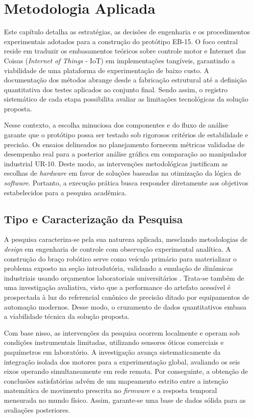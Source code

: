 \chapter{Metodologia Aplicada}

Este capítulo detalha as estratégias, as decisões de engenharia e os procedimentos experimentais adotados para a construção do protótipo EB-15. O foco central reside em traduzir os embasamentos teóricos sobre controle motor e Internet das Coisas (\textit{Internet of Things} - IoT) em implementações tangíveis, garantindo a viabilidade de uma plataforma de experimentação de baixo custo. A documentação dos métodos abrange desde a fabricação estrutural até a definição quantitativa dos testes aplicados ao conjunto final. Sendo assim, o registro sistemático de cada etapa possibilita avaliar as limitações tecnológicas da solução proposta.

Nesse contexto, a escolha minuciosa dos componentes e do fluxo de análise garante que o protótipo possa ser testado sob rigorosos critérios de estabilidade e precisão. Os ensaios delineados no planejamento fornecem métricas validadas de desempenho real para a posterior análise gráfica em comparação ao manipulador industrial UR-10. Deste modo, as intervenções metodológicas justificam as escolhas de \textit{hardware} em favor de soluções baseadas na otimização da lógica de \textit{software}. Portanto, a execução prática busca responder diretamente aos objetivos estabelecidos para a pesquisa acadêmica.

\section{Tipo e Caracterização da Pesquisa}

A pesquisa caracteriza-se pela sua natureza aplicada, mesclando metodologias de \textit{design} em engenharia de controle com observação experimental analítica. A construção do braço robótico serve como veículo primário para materializar o problema exposto na seção introdutória, validando a emulação de dinâmicas industriais usando orçamentos laboratoriais universitários \cite{siciliano2009}. Trata-se também de uma investigação avaliativa, visto que a performance do artefato acessível é prospectada à luz do referencial canônico de precisão ditado por equipamentos de automação modernos. Desse modo, o cruzamento de dados quantitativos embasa a viabilidade técnica da solução proposta.

Com base nisso, as intervenções da pesquisa ocorrem localmente e operam sob condições instrumentais limitadas, utilizando sensores óticos comerciais e paquímetros em laboratório. A investigação avança sistematicamente da integração isolada dos motores para a experimentação global, avaliando os seis eixos operando simultaneamente em rede remota. Por conseguinte, a obtenção de conclusões satisfatórias advém de um mapeamento estrito entre a intenção matemática de movimento prescrita no \textit{firmware} e a resposta temporal mensurada no mundo físico. Assim, garante-se uma base de dados sólida para as avaliações posteriores.

